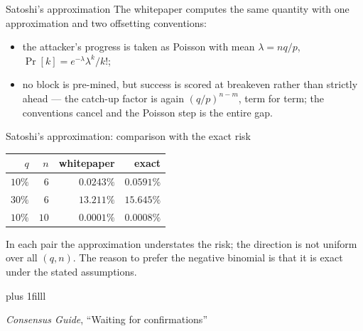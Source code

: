 \documentclass[aspectratio=169,11pt]{beamer}
\newcommand{\src}[1]{\par\vskip0pt plus 1filll
  {\fontsize{6}{7.2}\selectfont\color{arbdim}\raggedright #1\par}}
\begin{document}
\begin{frame}{Satoshi's approximation}
The whitepaper computes the same quantity with one approximation and
two offsetting conventions:
\begin{itemize}
\item the attacker's progress is taken as Poisson with mean
  $\lambda = nq/p$, $\Pr[k] = e^{-\lambda} \lambda^{k} / k!$;
\item no block is pre-mined, but success is scored at breakeven rather
  than strictly ahead --- the catch-up factor is again $(q/p)^{n-m}$,
  term for term; the conventions cancel and the Poisson step is the
  entire gap.
\end{itemize}
\end{frame}

\begin{frame}{Satoshi's approximation: comparison with the exact risk}
\begin{center}
\begin{tabular}{@{}rrrr@{}}
\toprule
$q$ & $n$ & whitepaper & exact \\
\midrule
$10\%$ & $6$ & $0.0243\%$ & $0.0591\%$ \\
$30\%$ & $6$ & $13.211\%$ & $15.645\%$ \\
$10\%$ & $10$ & $0.0001\%$ & $0.0008\%$ \\
\bottomrule
\end{tabular}
\end{center}
\smallskip
In each pair the approximation understates the risk; the direction is
not uniform over all $(q, n)$. The reason to prefer the negative
binomial is that it is exact under the stated assumptions.
\src{\emph{Consensus Guide}, ``Waiting for confirmations''}
\end{frame}
\end{document}
